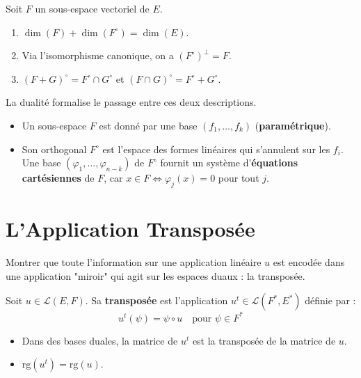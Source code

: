 \begin{theorem}
    Soit $F$ un sous-espace vectoriel de $E$.
    \begin{enumerate}
        \item $\dim(F) + \dim(F^\circ) = \dim(E)$.
        \item Via l'isomorphisme canonique, on a $(F^\circ)^\perp = F$.
        \item $(F+G)^\circ = F^\circ \cap G^\circ$ et $(F \cap G)^\circ = F^\circ + G^\circ$.
    \end{enumerate}
\end{theorem}

\begin{application}
    La dualité formalise le passage entre ces deux descriptions.
    \begin{itemize}
        \item Un sous-espace $F$ est donné par une base $(f_1, \dots, f_k)$ (\textbf{paramétrique}).
        \item Son orthogonal $F^\circ$ est l'espace des formes linéaires qui s'annulent sur les $f_i$. Une base $(\varphi_1, \dots, \varphi_{n-k})$ de $F^\circ$ fournit un système d'\textbf{équations cartésiennes} de $F$, car $x \in F \iff \varphi_j(x)=0$ pour tout $j$.
    \end{itemize}
\end{application}

\section{L'Application Transposée}

\begin{objectif}
    Montrer que toute l'information sur une application linéaire $u$ est encodée dans une application "miroir" qui agit sur les espaces duaux : la transposée.
\end{objectif}

\begin{definition}
    Soit $u \in \mathcal{L}(E,F)$. Sa \textbf{transposée} est l'application $u^t \in \mathcal{L}(F^*, E^*)$ définie par :
    $$ u^t(\psi) = \psi \circ u \quad \text{pour } \psi \in F^* $$
\end{definition}

\begin{proposition}
    \begin{itemize}
        \item Dans des bases duales, la matrice de $u^t$ est la transposée de la matrice de $u$.
        \item $\mathrm{rg}(u^t) = \mathrm{rg}(u)$.
    \end{itemize}
\end{proposition}

